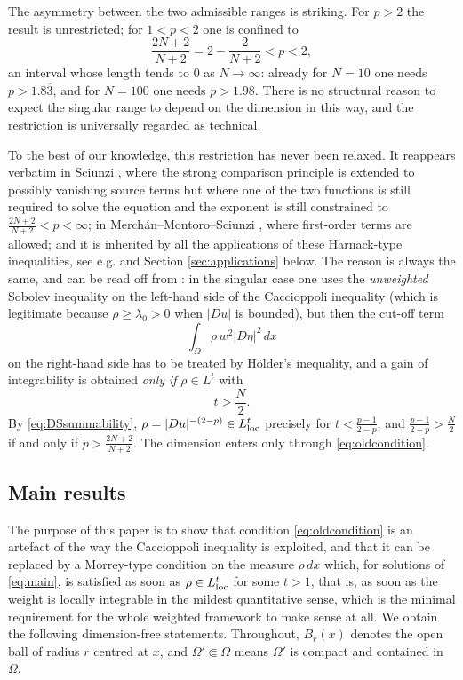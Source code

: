 \documentclass[reqno]{amsart}
\theoremstyle{plain}
\theoremstyle{definition}
\theoremstyle{remark}
\begin{document}
The asymmetry between the two admissible ranges is striking. For $p>2$ the result is unrestricted;
for $1<p<2$ one is confined to
\[
\frac{2N+2}{N+2}=2-\frac{2}{N+2}<p<2 ,
\]
an interval whose length tends to $0$ as $N\to\infty$: already for $N=10$ one needs $p>1.8\overline{3}$,
and for $N=100$ one needs $p>1.98$. There is no structural reason to expect the singular
range to depend on the dimension in this way, and the restriction is universally regarded as
technical.

To the best of our knowledge, this restriction has never been relaxed. It reappears verbatim in
Sciunzi \cite[Theorems 1.3--1.4]{Sci2}, where the strong comparison principle is extended to
possibly vanishing source terms but where one of the two functions is still required to solve the
equation and the exponent is still constrained to $\frac{2N+2}{N+2}<p<\infty$; in Merchán--Montoro--Sciunzi \cite[Theorems 1.1--1.2]{MMS}, where
first-order terms are allowed; and it is inherited by all the applications of these Harnack-type
inequalities, see e.g. \cite{FMS,Gatti,Sci1} and Section \ref{sec:applications} below. The reason
is always the same, and can be read off
from \cite[Case (b) of Theorem 3.1]{MMS}: in the singular case one uses the \emph{unweighted}
Sobolev inequality on the left-hand side of the Caccioppoli inequality (which is legitimate because
$\rho\ge\lambda_0>0$ when $|Du|$ is bounded), but then the cut-off term
\[
\int_\Omega \rho\, w^2 |D\eta|^2\,dx
\]
on the right-hand side has to be treated by H\"older's inequality, and a gain of integrability is
obtained \emph{only if} $\rho\in L^t$ with
\begin{equation}\label{eq:oldcondition}
t>\frac{N}{2}.
\end{equation}
By \eqref{eq:DSsummability}, $\rho=|Du|^{-(2-p)}\in L^t_{\rm loc}$ precisely for
$t<\frac{p-1}{2-p}$, and $\frac{p-1}{2-p}>\frac N2$ if and only if $p>\frac{2N+2}{N+2}$. The
dimension enters only through \eqref{eq:oldcondition}.

\subsection{Main results}
The purpose of this paper is to show that condition \eqref{eq:oldcondition} is an artefact of the
way the Caccioppoli inequality is exploited, and that it can be replaced by a Morrey-type condition
on the measure $\rho\,dx$ which, for solutions of \eqref{eq:main}, is satisfied as soon as
$\rho\in L^{t}_{\rm loc}$ for some $t>1$, that is, as soon as the weight is locally integrable in
the mildest quantitative sense, which is the minimal requirement for the whole weighted framework to
make sense at all. We obtain the following
dimension-free statements. Throughout, $B_r(x)$ denotes the open ball of radius $r$ centred at $x$,
and $\Omega'\Subset\Omega$ means $\overline{\Omega'}$ is compact and contained in $\Omega$.
\end{document}
